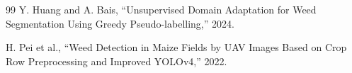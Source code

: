 \begin{singlespace}
\begin{thebibliography}{99}
Y. Huang and A. Bais, ``Unsupervised Domain Adaptation for Weed Segmentation Using Greedy Pseudo-labelling,'' 2024.

H. Pei et al., ``Weed Detection in Maize Fields by UAV Images Based on Crop Row Preprocessing and Improved YOLOv4,'' 2022.

	






\end{thebibliography}
\end{singlespace}
